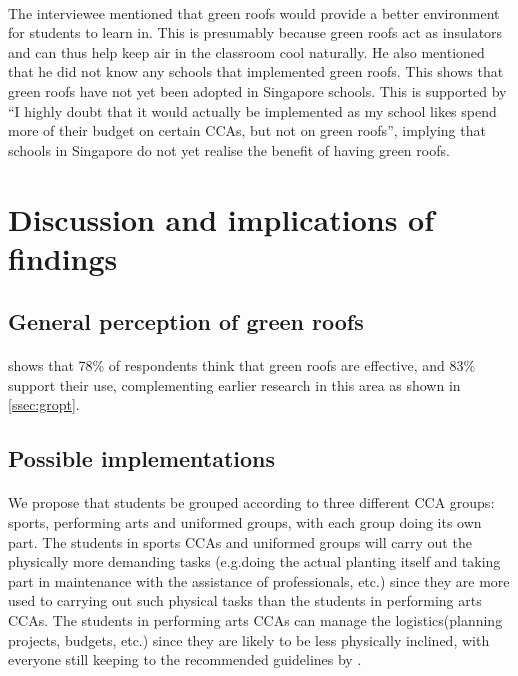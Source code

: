 \documentclass[a4paper]{article}
\begin{document}
\begin{multicols}{2}
  \paragraph{} The interviewee mentioned that green roofs would provide
  a better environment for students to learn in. This is presumably
  because green roofs act as insulators and can thus help keep air in the
  classroom cool naturally. He also mentioned that he did not know any
  schools that implemented green roofs. This shows that green roofs have
  not yet been adopted in Singapore schools. This is supported by ``I
  highly doubt that it would actually be implemented as my school likes
  spend more of their budget on certain CCAs, but not on green roofs'',
  implying that schools in Singapore do not yet realise the benefit of
  having green roofs.



  \section{Discussion and implications of findings}
  \subsection{General perception of green roofs}
  \paragraph{}  shows that 78\% of respondents
  think that green roofs are effective, and 83\% support their
  use, complementing earlier research in this area as shown in
  \cref{ssec:gropt}.


  \subsection{Possible implementations}
  \paragraph{} We propose that students be grouped according to three
  different CCA groups: sports, performing arts and uniformed groups,
  with each group doing its own part. The students in sports CCAs
  and uniformed groups will carry out the physically more demanding
  tasks (e.g.doing the actual planting itself and taking part in
  maintenance with the assistance of professionals, etc.) since they
  are more used to carrying out such physical tasks than the students in
  performing arts CCAs. The students in performing arts CCAs can manage
  the logistics(planning projects, budgets, etc.) since they are
  likely to be less physically inclined, with everyone still keeping to
  the recommended guidelines by \textcite{HKGreenRoofGL}.




\end{multicols}
\end{document}
